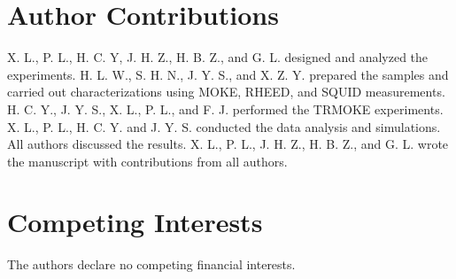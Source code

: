 \documentclass[%
 reprint,
superscriptaddress,
 amsmath,amssymb,
 aps,
prl,
]{revtex4-1}
\def\supplementfilename{supplement.pdf}
\def\numbersupplementpages{\the\pdflastximagepages}
\newif\ifarXiv
\begin{document}
\section{\label{sec:Contributions}Author Contributions}
X. L., P. L., H. C. Y, J. H. Z., H. B. Z., and G. L. designed and analyzed the experiments. H. L. W., S. H. N., J. Y. S., and X. Z. Y. prepared the samples and carried out characterizations using MOKE, RHEED, and SQUID measurements. H. C. Y., J. Y. S., X. L., P. L., and F. J. performed the TRMOKE experiments. X. L., P. L., H. C. Y. and J. Y. S. conducted the data analysis and simulations. All authors discussed the results. X. L., P. L., J. H. Z., H. B. Z., and G. L. wrote the manuscript with contributions from all authors.

\section{\label{sec:Contributions}Competing Interests}
The authors declare no competing financial interests.




\ifarXiv
    \foreach \x in {1,...,\numbersupplementpages}
    {
        \clearpage
        
    }
\fi
\end{document}
